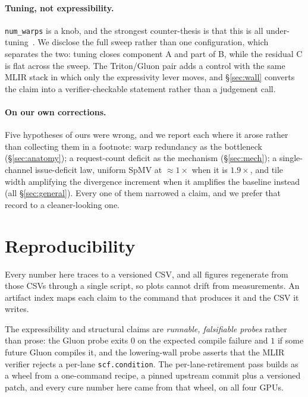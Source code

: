 \documentclass[sigplan,screen,review]{acmart}
\begin{document}
\paragraph{Tuning, not expressibility.} \texttt{num\_warps} is a knob, and the strongest
counter-thesis is that this is all under-tuning~\cite{ringlein2025}. We disclose the full
sweep rather than one configuration, which separates the two: tuning closes component A and
part of B, while the residual C is flat across the sweep. The Triton/Gluon pair adds a
control with the same MLIR stack in which only the expressivity lever moves, and
\S\ref{sec:wall} converts the claim into a verifier-checkable statement rather than a
judgement call.

\paragraph{On our own corrections.} Five hypotheses of ours were wrong, and we report each
where it arose rather than collecting them in a footnote: warp redundancy as the bottleneck
(\S\ref{sec:anatomy}); a request-count deficit as the mechanism (\S\ref{sec:mech}); a
single-channel issue-deficit law, uniform SpMV at ${\approx}1\times$ when it is
$1.9\times$, and tile width amplifying the divergence increment when it amplifies the
baseline instead (all \S\ref{sec:general}). Every one of them narrowed a claim, and we
prefer that record to a cleaner-looking one.

\section{Reproducibility}\label{sec:repro}
Every number here traces to a versioned CSV, and all figures regenerate from those CSVs
through a single script, so plots cannot drift from measurements. An artifact index maps
each claim to the command that produces it and the CSV it writes.

The expressibility and structural claims are \emph{runnable, falsifiable probes} rather than
prose: the Gluon probe exits $0$ on the expected compile failure and $1$ if some future
Gluon compiles it, and the lowering-wall probe asserts that the MLIR verifier rejects a
per-lane \texttt{scf.condition}. The per-lane-retirement pass builds as a wheel from a
one-command recipe, a pinned upstream commit plus a versioned patch, and every cure number
here came from that wheel, on all four GPUs.
\end{document}
